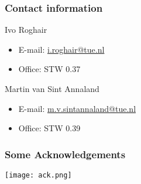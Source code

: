 \begin{frame}
 \frametitle{Contact information}
 \begin{block}{Ivo Roghair}
  \begin{itemize}
   \item E-mail: \href{mailto:i.roghair@tue.nl}{i.roghair@tue.nl}
   \item Office: STW 0.37
   \end{itemize} 
 \end{block}
 \vspace{1em}
  \begin{block}{Martin van Sint Annaland}
  \begin{itemize}
   \item E-mail: \href{mailto:m.v.sintannaland@tue.nl}{m.v.sintannaland@tue.nl}
   \item Office: STW 0.39 
   \end{itemize} 
 \end{block}
\end{frame}


\begin{frame}
 \frametitle{Some Acknowledgements}
 \centering\texttt{[image: ack.png]}
\end{frame}

